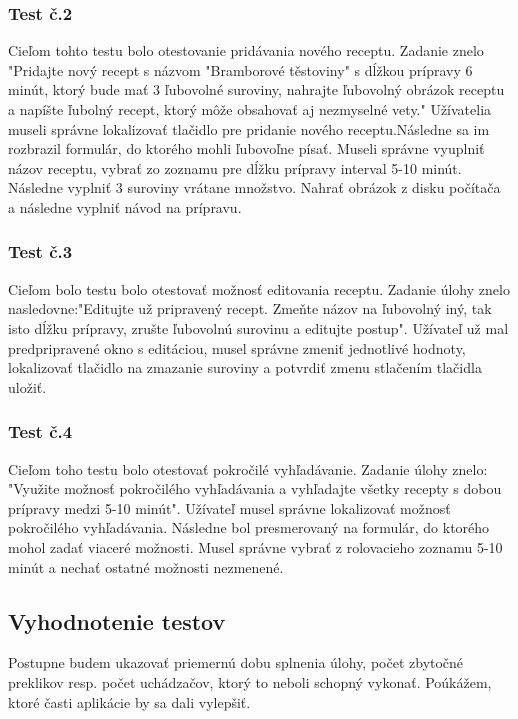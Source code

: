 \documentclass[12pt,a4paper,titlepage,final]{article}
\begin{document}
\subsubsection{Test č.2}
Cieľom tohto testu bolo otestovanie pridávania nového receptu. Zadanie znelo "Pridajte nový recept s názvom "Bramborové těstoviny" s dĺžkou prípravy 6 minút, ktorý bude mať 3 ľubovolné suroviny, nahrajte ľubovolný obrázok receptu a napíšte ľubolný recept, ktorý môže obsahovať aj nezmyselné vety." Užívatelia museli správne lokalizovať tlačidlo pre pridanie nového receptu.Následne sa im rozbrazil formulár, do ktorého mohli ľubovoľne písať. Museli správne vyuplniť názov receptu, vybrať zo zoznamu pre dĺžku prípravy interval 5-10 minút. Následne vyplniť 3 suroviny vrátane množstvo. Nahrať obrázok z disku počítača a následne vyplniť návod na prípravu.

\subsubsection{Test č.3}
Cieľom bolo testu bolo otestovať možnosť editovania receptu. Zadanie úlohy znelo nasledovne:"Editujte už pripravený recept. Zmeňte názov na ľubovolný iný, tak isto dĺžku prípravy, zrušte ľubovolnú surovinu a editujte postup". Užívateľ už mal predpripravené okno s editáciou, musel správne zmeniť jednotlivé hodnoty, lokalizovať tlačidlo na zmazanie suroviny a potvrdiť zmenu stlačením tlačidla uložiť.

\subsubsection{Test č.4}
Cieľom toho testu bolo otestovať pokročilé vyhľadávanie. Zadanie úlohy znelo: "Využite možnosť pokročilého vyhľadávania a vyhľadajte všetky recepty s dobou prípravy medzi 5-10 minút". Užívateľ musel správne lokalizovať možnosť pokročilého vyhľadávania. Následne bol presmerovaný na formulár, do ktorého mohol zadať viaceré možnosti. Musel správne vybrať z rolovacieho zoznamu 5-10 minút a nechať ostatné možnosti nezmenené.





\subsection{Vyhodnotenie testov}
Postupne budem ukazovať priemernú dobu splnenia úlohy, počet zbytočné preklikov resp. počet uchádzačov, ktorý to neboli schopný vykonať. Poúkážem, ktoré časti aplikácie by sa dali vylepšiť.
\end{document}
